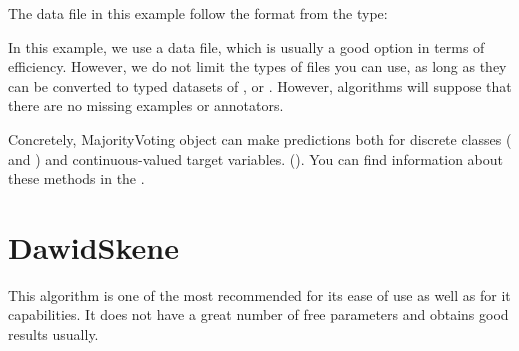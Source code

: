 \documentclass[letterpaper,10pt,english]{sphinxmanual}
\begin{document}
The data file in this example follow the format from the  type:

%
\begin{sphinxVerbatim}[commandchars=\\\{\}]
  
                    
                    
                    
\end{sphinxVerbatim}

In this example, we use a  data file, which is usually a good option in terms of
efficiency. However, we do not limit the types of files you can use, as long as they can be
converted to typed datasets of ,  or .
However, algorithms will suppose that there are no missing examples or annotators.

Concretely, MajorityVoting object can make predictions both for discrete classes ( and
) and continuous-valued target variables. (). You can find
information about these methods in the .


\section{DawidSkene}
\label{\detokenize{usage/examples:dawidskene}}
This algorithm is one of the most recommended for its ease of use as well as for it capabilities. It does not
have a great number of free parameters and obtains good results usually.
\end{document}
